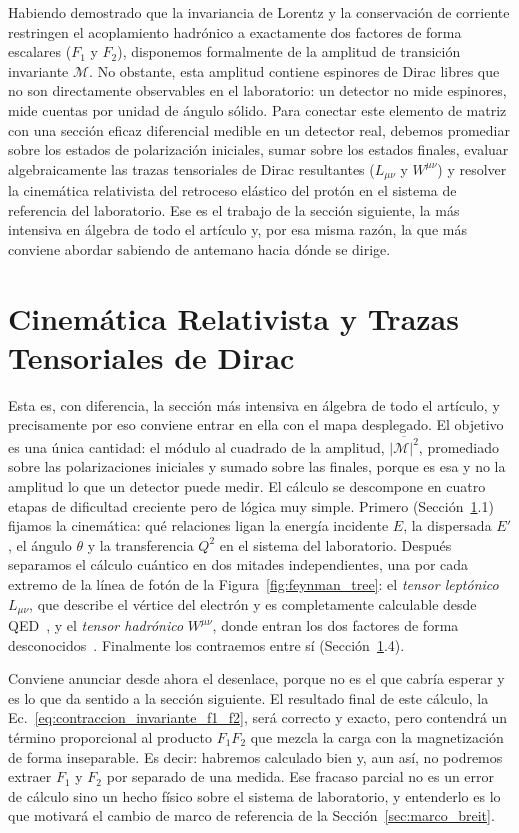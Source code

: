 \documentclass[10pt,a4paper]{article}
\begin{document}
Habiendo demostrado que la invariancia de Lorentz y la conservación de corriente restringen el acoplamiento hadrónico a exactamente dos factores de forma escalares ($F_1$ y $F_2$), disponemos formalmente de la amplitud de transición invariante $\mathcal{M}$. No obstante, esta amplitud contiene espinores de Dirac libres que no son directamente observables en el laboratorio: un detector no mide espinores, mide cuentas por unidad de ángulo sólido. Para conectar este elemento de matriz con una sección eficaz diferencial medible en un detector real, debemos promediar sobre los estados de polarización iniciales, sumar sobre los estados finales, evaluar algebraicamente las trazas tensoriales de Dirac resultantes ($L_{\mu\nu}$ y $W^{\mu\nu}$) y resolver la cinemática relativista del retroceso elástico del protón en el sistema de referencia del laboratorio. Ese es el trabajo de la sección siguiente, la más intensiva en álgebra de todo el artículo y, por esa misma razón, la que más conviene abordar sabiendo de antemano hacia dónde se dirige.
\section{Cinemática Relativista y Trazas Tensoriales de Dirac}
\label{sec:cinematica_trazas}

Esta es, con diferencia, la sección más intensiva en álgebra de todo el artículo, y precisamente por eso conviene entrar en ella con el mapa desplegado. El objetivo es una única cantidad: el módulo al cuadrado de la amplitud, $\overline{|\mathcal{M}|^2}$, promediado sobre las polarizaciones iniciales y sumado sobre las finales, porque es esa y no la amplitud lo que un detector puede medir. El cálculo se descompone en cuatro etapas de dificultad creciente pero de lógica muy simple. Primero (Sección~\ref{sec:cinematica_trazas}.1) fijamos la cinemática: qué relaciones ligan la energía incidente $E$, la dispersada $E'$, el ángulo $\theta$ y la transferencia $Q^2$ en el sistema del laboratorio. Después separamos el cálculo cuántico en dos mitades independientes, una por cada extremo de la línea de fotón de la Figura~\ref{fig:feynman_tree}: el \emph{tensor leptónico} $L_{\mu\nu}$, que describe el vértice del electrón y es completamente calculable desde QED~\cite{halzen1984,thomson2013}, y el \emph{tensor hadrónico} $W^{\mu\nu}$, donde entran los dos factores de forma desconocidos~\cite{das2003,henley2007}. Finalmente los contraemos entre sí (Sección~\ref{sec:cinematica_trazas}.4).

Conviene anunciar desde ahora el desenlace, porque no es el que cabría esperar y es lo que da sentido a la sección siguiente. El resultado final de este cálculo, la Ec.~\eqref{eq:contraccion_invariante_f1_f2}, será correcto y exacto, pero contendrá un término proporcional al producto $F_1 F_2$ que mezcla la carga con la magnetización de forma inseparable. Es decir: habremos calculado bien y, aun así, no podremos extraer $F_1$ y $F_2$ por separado de una medida. Ese fracaso parcial no es un error de cálculo sino un hecho físico sobre el sistema de laboratorio, y entenderlo es lo que motivará el cambio de marco de referencia de la Sección~\ref{sec:marco_breit}.
\end{document}
